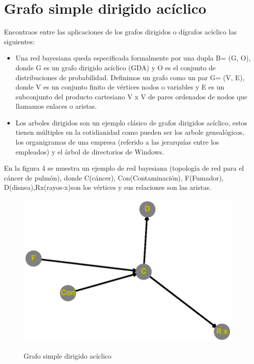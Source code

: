 \documentclass{article}
\begin{document}
\section{Grafo simple dirigido acíclico}
Encontraos entre las aplicaciones de los grafos dirigidos o dígrafos acíclico las siguientes: 
\begin{itemize}
\item Una red bayesiana queda especificada formalmente por una dupla B= (G, O), donde G es un grafo dirigido acíclico (GDA) y O es el conjunto de distribuciones de probabilidad. Definimos un grafo como un par G= (V, E), donde V es un conjunto finito de vértices nodos o variables y E es un subconjunto del producto cartesiano V x V de pares ordenados de nodos que llamamos enlaces o aristas\cite{gf2}.
\item Los arboles dirigidos son un ejemplo clásico de grafos dirigidos acíclico, estos tienen múltiples en la cotidianidad como pueden ser los arbole genealógicos, los organigramas de una empresa (referido a las jerarquías entre los empleados) y el árbol de directorios de Windows.

\end{itemize}	
En la figura 4 se muestra un ejemplo de red bayesiana (topología de red para el cáncer de pulmón), donde C(cáncer), Con(Contaminación), F(Fumador), D(disnea),Rx(rayos-x)son los vértices y sus relaciones son las aristas.

\begin{center}

\end{center}

\begin{figure}[h]
\begin{center}
\includegraphics[scale=0.7]{Graf4.eps}\\
\caption{Grafo simple dirigido acíclico}
\end{center}

\end{figure}
\end{document}
